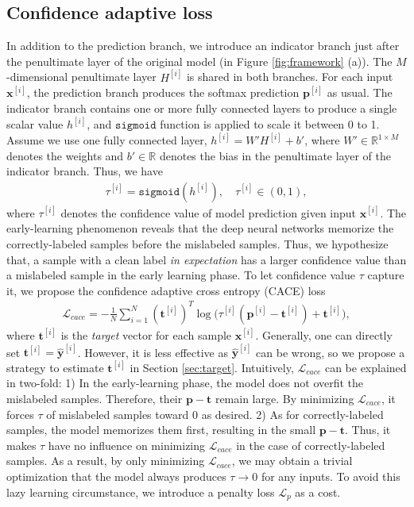 \documentclass{article}
\begin{document}
\subsection{Confidence adaptive loss}
\label{sec:cal}
In addition to the prediction branch, we introduce an indicator branch just after the penultimate layer of the original model (in Figure \ref{fig:framework} (a)). The $M$-dimensional penultimate layer $H^{[i]}$ is shared in both branches. For each input $\bm{x}^{[i]}$, the prediction branch produces the softmax prediction $\bm{p}^{[i]}$ as usual. The indicator branch contains one or more fully connected layers to produce a single scalar value $h^{[i]}$, and $\mathtt{sigmoid}$ function is applied to scale it between 0 to 1. Assume we use one fully connected layer, $h^{[i]}=W'H^{[i]}+b'$, where $W' \in \mathbb{R}^{1\times M}$ denotes the weights and $b' \in \mathbb{R}$ denotes the bias in the penultimate layer of the indicator branch. Thus, we have
\begin{align}
	\tau^{[i]} = \mathtt{sigmoid} (h^{[i]}), \quad \tau^{[i]} \in (0,1), 
\end{align}
where $\tau^{[i]}$ denotes the confidence value of model prediction given input $\bm{x}^{[i]}$. The early-learning phenomenon reveals that the deep neural networks memorize the correctly-labeled samples before the mislabeled samples. Thus, we hypothesize that, a sample with a clean label \emph{in expectation} has a larger confidence value than a mislabeled sample in the early learning phase. To let confidence value $\tau$ capture it, we propose the confidence adaptive cross entropy (CACE) loss 
\begin{align}
	\mathcal{L}_{cace}=-\frac{1}{N}\sum_{i=1}^{N}(\bm{t}^{[i]})^{T}\log\big(\tau^{[i]}  
	(\bm{p}^{[i]}-\bm{t}^{[i]})+\bm{t}^{[i]}\big), 
\end{align}
where $\bm{t}^{[i]}$ is the \emph{target} vector for each sample $\bm{x}^{[i]}$. Generally, one can directly set $\bm{t}^{[i]}=\bm{\hat{y}}^{[i]}$. However, it is less effective as $\bm{\hat{y}}^{[i]}$ can be wrong, so we propose a strategy to estimate $\bm{t}^{[i]}$ in Section \ref{sec:target}.
Intuitively, $\mathcal{L}_{cace}$ can be explained in two-fold: 1) In the early-learning phase, the model does not overfit the mislabeled samples. Therefore, their $\bm{p}-\bm{t}$ remain large. By minimizing $\mathcal{L}_{cace}$, it forces $\tau$ of mislabeled samples toward 0 as desired. 2) As for correctly-labeled samples, the model memorizes them first, resulting in the small $\bm{p}-\bm{t}$. Thus, it makes $\tau$ have no influence on minimizing $\mathcal{L}_{cace}$ in the case of correctly-labeled samples. As a result, by only minimizing $\mathcal{L}_{cace}$, we may obtain a trivial optimization that the model always produces $\tau \rightarrow 0$ for any inputs. To avoid this lazy learning circumstance, we introduce a penalty loss $\mathcal{L}_{p}$ as a cost.
\end{document}
